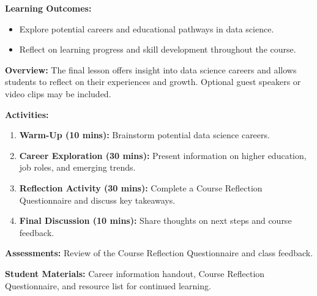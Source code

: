 \documentclass{tufte-book}
\begin{document}
\medskip
\textbf{Learning Outcomes:}
\begin{itemize}[leftmargin=*, label={\textbullet}]
    \item Explore potential careers and educational pathways in data science.
    \item Reflect on learning progress and skill development throughout the course.
\end{itemize}

\medskip
\textbf{Overview:}  
The final lesson offers insight into data science careers and allows students to reflect on their experiences and growth. Optional guest speakers or video clips may be included.

\medskip
\textbf{Activities:}
\begin{enumerate}[label=\arabic*.]
    \item \textbf{Warm-Up (10 mins):} Brainstorm potential data science careers.
    \item \textbf{Career Exploration (30 mins):} Present information on higher education, job roles, and emerging trends.
    \item \textbf{Reflection Activity (30 mins):} Complete a Course Reflection Questionnaire and discuss key takeaways.
    \item \textbf{Final Discussion (10 mins):} Share thoughts on next steps and course feedback.
\end{enumerate}

\medskip
\textbf{Assessments:}  
Review of the Course Reflection Questionnaire and class feedback.

\medskip
\textbf{Student Materials:}  
Career information handout, Course Reflection Questionnaire, and resource list for continued learning.

\backmatter


\printindex
\end{document}
